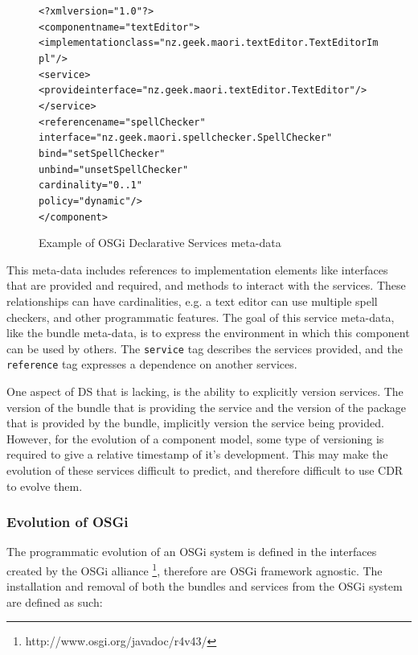 \begin{figure}[htp]
\begin{center}
\begin{alltt}
<?xml version="1.0"?>
<component name="textEditor">
    <implementation class="nz.geek.maori.textEditor.TextEditorImpl"/>
    <service>
        <provide interface="nz.geek.maori.textEditor.TextEditor"/>
    </service>
    <reference name="spellChecker"
        interface="nz.geek.maori.spellchecker.SpellChecker"
        bind="setSpellChecker"
        unbind="unsetSpellChecker"
        cardinality="0..1"
        policy="dynamic"/>
</component>
\end{alltt}
  \caption[OSGi Declarative Services]{Example of OSGi Declarative Services meta-data}
  \label{dsmetadata}
\end{center}
\end{figure}

This meta-data includes references to implementation elements like interfaces that are provided and required, and methods to interact with the services.
These relationships can have cardinalities, e.g. a text editor can use multiple spell checkers, and other programmatic features.
The goal of this service meta-data, like the bundle meta-data, is to express the environment in which this component can be used by others.
The \verb+service+ tag describes the services provided, and the \verb+reference+ tag expresses a dependence on another services.

One aspect of DS that is lacking, is the ability to explicitly version services.
The version of the bundle that is providing the service and the version of the package that is provided by the bundle, implicitly version the service being provided.
However, for the evolution of a component model, some type of versioning is required to give a relative timestamp of it's development.
This may make the evolution of these services difficult to predict, and therefore difficult to use CDR to evolve them. 


\subsubsection{Evolution of OSGi}
The programmatic evolution of an OSGi system is defined in the interfaces created by the OSGi alliance \footnote{http://www.osgi.org/javadoc/r4v43/}, therefore are OSGi framework agnostic.
The installation and removal of both the bundles and services from the OSGi system are defined as such:
 
